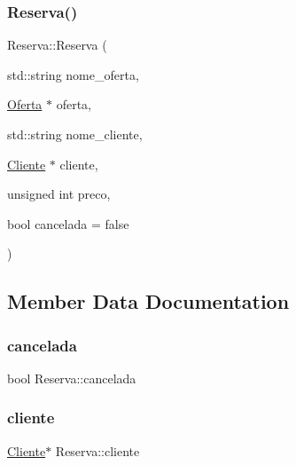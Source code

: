 \subsubsection{\texorpdfstring{Reserva()}{Reserva()}}
{\footnotesize\ttfamily Reserva\+::\+Reserva (\begin{DoxyParamCaption}\item[{std\+::string}]{nome\+\_\+oferta,  }\item[{\hyperlink{classOferta}{Oferta} $\ast$}]{oferta,  }\item[{std\+::string}]{nome\+\_\+cliente,  }\item[{\hyperlink{classCliente}{Cliente} $\ast$}]{cliente,  }\item[{unsigned int}]{preco,  }\item[{bool}]{cancelada = {\ttfamily false} }\end{DoxyParamCaption})}



\subsection{Member Data Documentation}
\mbox{\label{classReserva_aab57a0212741492180a4ef8eeb340d4c}} 
\subsubsection{\texorpdfstring{cancelada}{cancelada}}
{\footnotesize\ttfamily bool Reserva\+::cancelada\hspace{0.3cm}{\ttfamily [private]}}

\mbox{\label{classReserva_acc8b137ed21ce17aba40105e7e44bbb9}} 
\subsubsection{\texorpdfstring{cliente}{cliente}}
{\footnotesize\ttfamily \hyperlink{classCliente}{Cliente}$\ast$ Reserva\+::cliente\hspace{0.3cm}{\ttfamily [private]}}

\mbox{\label{classReserva_a2f2973c6da62a5533153325efa2d836d}} 
